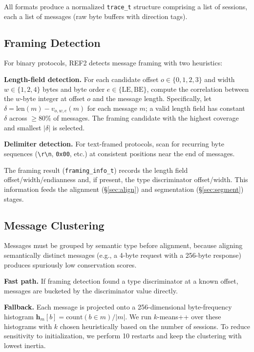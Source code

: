 \documentclass[letterpaper,twocolumn,10pt]{article}
\begin{document}
All formats produce a normalized \texttt{trace\_t} structure comprising a list
of sessions, each a list of messages (raw byte buffers with direction tags).

\subsection{Framing Detection}

For binary protocols, \textsc{REF2} detects message framing with two
heuristics:

\textbf{Length-field detection.}  For each candidate offset $o \in \{0,1,2,3\}$
and width $w \in \{1,2,4\}$ bytes and byte order $e \in \{\text{LE}, \text{BE}\}$,
compute the correlation between the $w$-byte integer at offset $o$ and
the message length.  Specifically, let $\delta = \text{len}(m) - v_{o,w,e}(m)$
for each message $m$; a valid length field has constant $\delta$ across $\geq
80\%$ of messages.  The framing candidate with the highest coverage and
smallest $|\delta|$ is selected.

\textbf{Delimiter detection.}  For text-framed protocols, scan for recurring
byte sequences (\texttt{\textbackslash r\textbackslash n}, \texttt{0x00}, etc.)
at consistent positions near the end of messages.

The framing result (\texttt{framing\_info\_t}) records the length field
offset/width/endianness and, if present, the type discriminator offset/width.
This information feeds the alignment (\S\ref{sec:align}) and segmentation
(\S\ref{sec:segment}) stages.

\subsection{Message Clustering}

Messages must be grouped by semantic type before alignment, because aligning
semantically distinct messages (e.g., a 4-byte request with a 256-byte response)
produces spuriously low conservation scores.

\textbf{Fast path.}  If framing detection found a type discriminator at a known
offset, messages are bucketed by the discriminator value directly.

\textbf{Fallback.}  Each message is projected onto a 256-dimensional
byte-frequency histogram $\mathbf{h}_m[b] = \text{count}(b \in m)/|m|$.
We run $k$-means++ \cite{kmeanspp} over these histograms with $k$ chosen
heuristically based on the number of sessions.  To reduce sensitivity to
initialization, we perform 10 restarts and keep the clustering with lowest
inertia.
\end{document}
